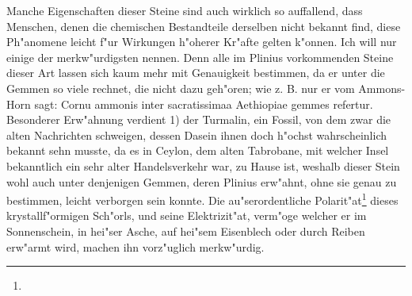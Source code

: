 \documentclass[a4paper, 11pt, oneside, polutonikogreek, german]{article}
\begin{document}
Manche Eigenschaften dieser Steine sind auch wirklich so auffallend, dass Menschen, denen die chemischen Bestandteile derselben nicht bekannt find, diese Ph"anomene leicht f"ur Wirkungen h"oherer Kr"afte gelten k"onnen. Ich will nur einige der merkw"urdigsten nennen. Denn alle im Plinius vorkommenden Steine dieser Art lassen sich kaum mehr mit Genauigkeit bestimmen, da er unter die Gemmen so viele rechnet, die nicht dazu geh"oren; wie z. B. nur er vom Ammons-Horn sagt: Cornu ammonis inter sacratissimaa Aethiopiae gemmes refertur. Besonderer Erw"ahnung verdient 1) der Turmalin, ein Fossil, von dem zwar die alten Nachrichten schweigen, dessen Dasein ihnen doch h"ochst wahrscheinlich bekannt sehn musste, da es in Ceylon, dem alten Tabrobane, mit welcher Insel bekanntlich ein sehr alter Handelsverkehr war, zu Hause ist, weshalb dieser Stein wohl auch unter denjenigen Gemmen, deren Plinius erw"ahnt, ohne sie genau zu bestimmen, leicht verborgen sein konnte. Die au"serordentliche Polarit"at\footnote{} dieses krystallf"ormigen Sch"orls, und seine Elektrizit"at, verm"oge welcher er im Sonnenschein, in hei"ser Asche, auf hei"sem Eisenblech oder durch Reiben erw"armt wird, machen ihn vorz"uglich merkw"urdig.
\end{document}
